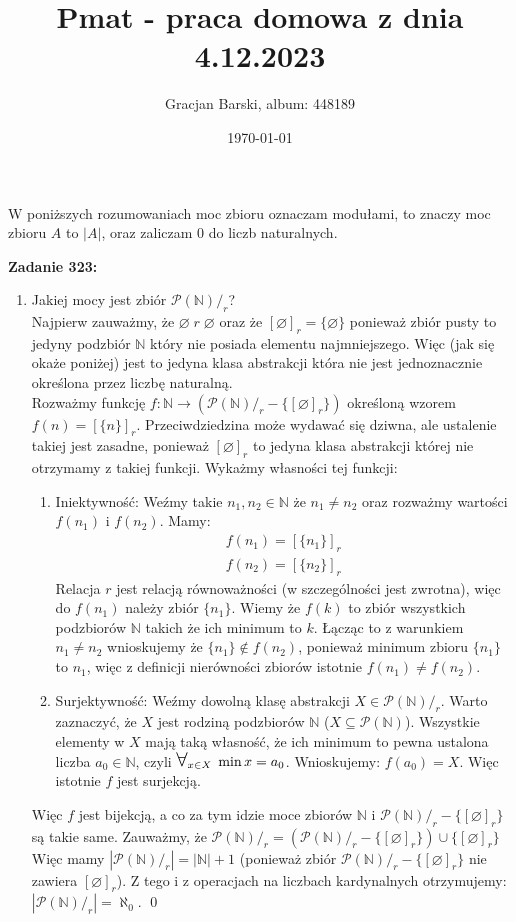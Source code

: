 \documentclass[10pt]{article}
\title{Pmat - praca domowa z dnia 4.12.2023}
\author{Gracjan Barski, album: 448189}
\date{\today}
\newcommand{\N}{\mathbb{N}}
\newcommand{\Pows}{\mathcal{P}}
\newcommand{\Forall}{{\Large\mbox{$\forall$}}}
\begin{document}
\maketitle
\onehalfspacing
\begin{center}
    W poniższych rozumowaniach moc zbioru oznaczam modułami, to znaczy moc zbioru $A$ to $|A|$, oraz zaliczam $0$ do liczb naturalnych.
\end{center}
\textbf{Zadanie 323:}
\begin{enumerate}[1)]
    \item Jakiej mocy jest zbiór $\Pows (\N)/_r$? \\[5pt]
    Najpierw zauważmy, że $\varnothing \; r \; \varnothing$ oraz że $[\varnothing]_r = \{\varnothing\}$ ponieważ zbiór pusty to jedyny podzbiór $\N$ który nie posiada elementu najmniejszego. Więc (jak się okaże poniżej) jest to jedyna klasa abstrakcji która nie jest jednoznacznie określona przez liczbę naturalną. \\[5pt]
    Rozważmy funkcję $f \colon \N \to (\Pows (\N)/_r - \{[\varnothing]_r\})$ określoną wzorem $f(n) = [\{n\}]_r$. Przeciwdziedzina może wydawać się dziwna, ale ustalenie takiej jest zasadne, ponieważ $[\varnothing]_r$ to jedyna klasa abstrakcji której nie otrzymamy z takiej funkcji. Wykażmy własności tej funkcji:
    \begin{enumerate}
        \item Iniektywność: Weźmy takie $n_1, n_2 \in \N$ że $n_1 \neq n_2$ oraz rozważmy wartości $f(n_1)$ i $f(n_2)$. Mamy:
        \begin{align*}
            f(n_1) = [\{n_1\}]_r \\
            f(n_2) = [\{n_2\}]_r
        \end{align*}
        Relacja $r$ jest relacją równoważności (w szczególności jest zwrotna), więc do $f(n_1)$ należy zbiór $\{n_1\}$. Wiemy że $f(k)$ to zbiór wszystkich podzbiorów $\N$ takich że ich minimum to $k$. Łącząc to z warunkiem $n_1 \neq n_2$ wnioskujemy że $\{n_1\} \notin f(n_2)$, ponieważ minimum zbioru $\{n_1\}$ to $n_1$, więc z definicji nierówności zbiorów istotnie $f(n_1) \neq f(n_2)$. 
        \item Surjektywność: Weźmy dowolną klasę abstrakcji $X \in \Pows (\N)/_r$. Warto zaznaczyć, że $X$ jest rodziną podzbiorów $\N$ ($X \subseteq \Pows (\N)$). Wszystkie elementy w $X$ mają taką własność, że ich minimum to pewna ustalona liczba $a_0 \in \N$, czyli $\Forall_{x \in X} \; \min x = a_0$. Wnioskujemy: $f(a_0) = X$. Więc istotnie $f$ jest surjekcją.
    \end{enumerate}
    Więc $f$ jest bijekcją, a co za tym idzie moce zbiorów $\N$ i $\Pows (\N)/_r - \{[\varnothing]_r\}$ są takie same. Zauważmy, że $\Pows (\N)/_r = (\Pows (\N)/_r - \{[\varnothing]_r\}) \cup \{[\varnothing]_r\}$ Więc mamy $|\Pows (\N)/_r| = |\N| + 1$ (ponieważ zbiór $\Pows (\N)/_r - \{[\varnothing]_r\}$ nie zawiera $[\varnothing]_r$). Z tego i z operacjach na liczbach kardynalnych otrzymujemy: $|\Pows (\N)/_r| = \aleph_0$. \qed
    

\end{enumerate}
\end{document}
